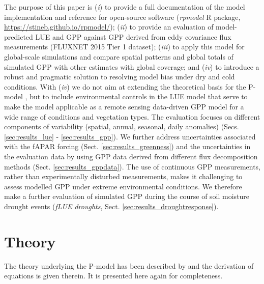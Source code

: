 \documentclass[gmd, manuscript]{copernicus}
\begin{document}
The purpose of this paper is (\textit{i}) to provide a full documentation of the model implementation and reference for open-source software (\textit{rpmodel} R package, \url{https://stineb.github.io/rpmodel/}); (\textit{ii}) to provide an evaluation of model-predicted LUE and GPP against GPP derived from eddy covariance flux measurements (FLUXNET 2015 Tier 1 dataset); (\textit{iii}) to apply this model for global-scale simulations and compare spatial patterns and global totals of simulated GPP with other estimates with global coverage; and (\textit{iv}) to introduce a robust and pragmatic solution to resolving model bias under dry and cold conditions. With (\textit{iv}) we do not aim at extending the theoretical basis for the P-model \citep{prentice14ecollett, wang17natpl}, but to include environmental controls in the LUE model that serve to make the model applicable as a remote sensing data-driven GPP model for a wide range of conditions and vegetation types. The evaluation focuses on different components of variability (spatial, annual, seasonal, daily anomalies) (Secs. \ref{sec:results_lue} - \ref{sec:results_gpp}). We further address uncertainties associated with the fAPAR forcing (Sect. \ref{sec:results_greenness}) and the uncertainties in the evaluation data by using GPP data derived from different flux decomposition methods (Sect. \ref{sec:results_gppdata}). The use of continuous GPP measurements, rather than experimentally disturbed measurements, makes it challenging to assess modelled GPP under extreme environmental conditions. We therefore make a further evaluation of simulated GPP during the course of soil moisture drought events (\textit{fLUE droughts}, Sect. \ref{sec:results_droughtresponse}).


\section{Theory}
\label{sec:theory}

The theory underlying the P-model has been described by \citet{wang17natpl} and the derivation of equations is given therein. It is presented here again for completeness.
\end{document}

